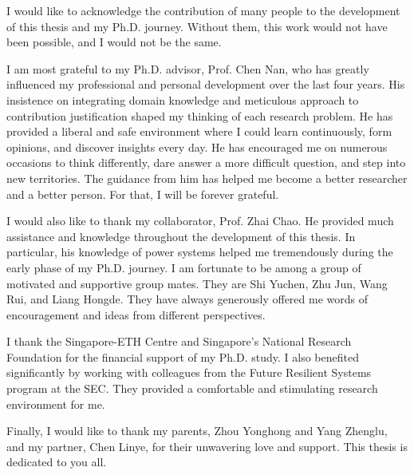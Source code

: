 \begin{acknowledgments}

I would like to acknowledge the contribution of many people to the development of this thesis and my Ph.D. journey. Without them, this work would not have been possible, and I would not be the same. 

I am most grateful to my Ph.D. advisor, Prof. Chen Nan, who has greatly influenced my professional and personal development over the last four years. His insistence on integrating domain knowledge and meticulous approach to contribution justification shaped my thinking of each research problem. He has provided a liberal and safe environment where I could learn continuously, form opinions, and discover insights every day. He has encouraged me on numerous occasions to think differently, dare answer a more difficult question, and step into new territories. The guidance from him has helped me become a better researcher and a better person. For that, I will be forever grateful.  

I would also like to thank my collaborator, Prof. Zhai Chao. He provided much assistance and knowledge throughout the development of this thesis. In particular, his knowledge of power systems helped me tremendously during the early phase of my Ph.D. journey. I am fortunate to be among a group of motivated and supportive group mates. They are Shi Yuchen, Zhu Jun, Wang Rui, and Liang Hongde. They have always generously offered me words of encouragement and ideas from different perspectives. 

I thank the Singapore-ETH Centre and Singapore's National Research Foundation for the financial support of my Ph.D. study. I also benefited significantly by working with colleagues from the Future Resilient Systems program at the SEC. They provided a comfortable and stimulating research environment for me. 

Finally, I would like to thank my parents, Zhou Yonghong and Yang Zhenglu, and my partner, Chen Linye, for their unwavering love and support. This thesis is dedicated to you all. 


\end{acknowledgments}
